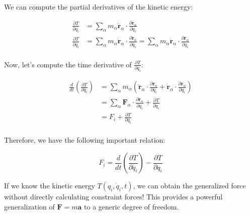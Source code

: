 We can compute the partial derivatives of the kinetic energy:

\begin{align*}
    \frac {\partial T}{\partial q_i} &= \sum_\alpha m_\alpha \dot{\mathbf{r}}_\alpha \cdot \frac{\partial \dot{\mathbf{r}}_\alpha}{\partial q_i} \\
    \frac {\partial T}{\partial \dot{q_i}} &= \sum_\alpha m_\alpha \dot{\mathbf{r}}_\alpha \cdot \frac{\partial \dot{\mathbf{r}}_\alpha}{\partial \dot{q_i}} = \sum_\alpha m_\alpha \dot{\mathbf{r}}_\alpha \cdot \frac{\partial \mathbf{r}_\alpha}{\partial q_i}\\
\end{align*}

Now, let's compute the time derivative of $\frac {\partial T}{\partial \dot{q_i}}$:

\begin{align*}
    \frac{d}{dt} \left(\frac {\partial T}{\partial \dot{q_i}}\right) &= \sum_\alpha m_\alpha \left(\ddot{\mathbf{r}}_\alpha \cdot \frac{\partial \mathbf{r}_\alpha}{\partial q_i} + \dot{\mathbf{r}}_\alpha \cdot \frac{\partial \dot{\mathbf{r}}_\alpha}{\partial q_i}\right) \\
    &= \sum_\alpha \mathbf{F}_\alpha \cdot \frac{\partial \mathbf{r}_\alpha}{\partial q_i} + \frac{\partial T}{\partial q_i} \\
    &= F_i + \frac{\partial T}{\partial q_i} \\
\end{align*}

Therefore, we have the following important relation:

\begin{equation}
    F_i = \frac{d}{dt} \left(\frac {\partial T}{\partial \dot{q_i}}\right) - \frac{\partial T}{\partial q_i}
\end{equation}

If we know the kinetic energy $T(q_i, \dot{q}_i, t)$, we can obtain the generalized force 
without directly calculating constraint forces! This provides a powerful generalization 
of $\mathbf{F} = m\mathbf{a}$ to a generic degree of freedom.